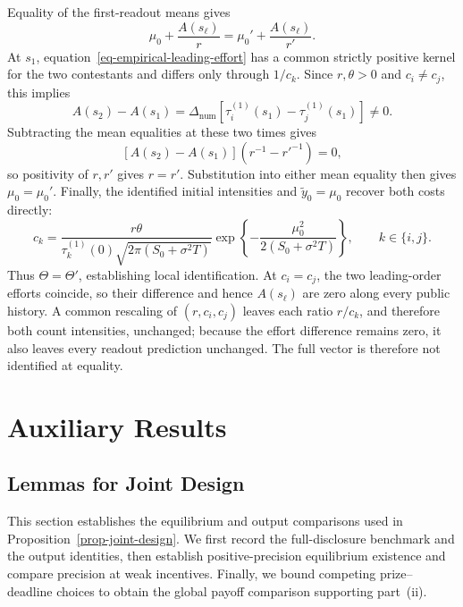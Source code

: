 \documentclass[mnsc]{informs3}
\begin{document}
\begin{APPENDICES}
{Equality of the first-readout means gives
\[
\mu_0+\frac{A(s_\ell)}r
=\mu_0'+\frac{A(s_\ell)}{r'}.
\]
At $s_1$, equation~\eqref{eq-empirical-leading-effort} has a common
strictly positive kernel for the two contestants and differs only through
$1/c_k$. Since $r,\theta>0$ and $c_i\ne c_j$, this implies
\[
A(s_2)-A(s_1)
=\Delta_{\mathrm{num}}\left[\tau_i^{(1)}(s_1)-\tau_j^{(1)}(s_1)\right]\ne0.
\]
Subtracting the mean equalities at these two times gives
\[
\left[A(s_2)-A(s_1)\right]\left(r^{-1}-r'^{-1}\right)=0,
\]
so positivity of $r,r'$ gives $r=r'$. Substitution into either mean
equality then gives $\mu_0=\mu_0'$. Finally, the identified initial
intensities and $\tilde y_0=\mu_0$ recover both costs directly:
\[
c_k=\frac{r\theta}{\tau_k^{(1)}(0)\sqrt{2\pi(S_0+\sigma^2T)}}
\exp\!\left\{-\frac{\mu_0^2}{2(S_0+\sigma^2T)}\right\},
\qquad k\in\{i,j\}.
\]
Thus $\Theta=\Theta'$, establishing local identification. At $c_i=c_j$,
the two leading-order efforts coincide, so their difference and hence
$A(s_\ell)$ are zero along every public history. A common rescaling of
$(r,c_i,c_j)$ leaves each ratio $r/c_k$, and therefore both count
intensities, unchanged; because the effort difference remains zero, it
also leaves every readout prediction unchanged. The full vector is
therefore not identified at equality.
\Halmos
\endproof
}






\section{Auxiliary Results}

\subsection{{Lemmas for Joint Design}}\label{app-joint-design-lemmas}
{
This section establishes the equilibrium and output comparisons used in
Proposition~\ref{prop-joint-design}. We first record the full-disclosure
benchmark and the output identities, then establish positive-precision
equilibrium existence and compare precision at weak incentives. Finally,
we bound competing prize--deadline choices to obtain the global payoff
comparison supporting part~(ii).

}
\end{APPENDICES}
\end{document}
